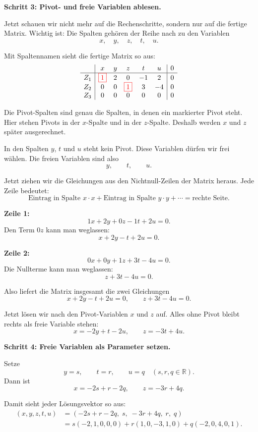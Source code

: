 \documentclass[a4paper,12pt]{article}
\newcommand{\piv}[1]{{\color{red}\boxed{#1}}}
\begin{document}
\textbf{Schritt 3: Pivot- und freie Variablen ablesen.}

Jetzt schauen wir nicht mehr auf die Rechenschritte, sondern nur auf die fertige Matrix.
Wichtig ist: Die Spalten geh\"oren der Reihe nach zu den Variablen
\[
x,\quad y,\quad z,\quad t,\quad u.
\]

Mit Spaltennamen sieht die fertige Matrix so aus:
\[
\begin{array}{c|ccccc|c}
 & x & y & z & t & u & 0 \\ \hline
Z_1 & \piv{1} & 2 & 0 & -1 & 2 & 0 \\
Z_2 & 0 & 0 & \piv{1} & 3 & -4 & 0 \\
Z_3 & 0 & 0 & 0 & 0 & 0 & 0
\end{array}
\]

Die Pivot-Spalten sind genau die Spalten, in denen ein markierter Pivot steht.
Hier stehen Pivots in der $x$-Spalte und in der $z$-Spalte.
Deshalb werden $x$ und $z$ sp\"ater ausgerechnet.

In den Spalten $y$, $t$ und $u$ steht kein Pivot.
Diese Variablen d\"urfen wir frei w\"ahlen.
Die freien Variablen sind also
\[
y,\qquad t,\qquad u.
\]

Jetzt ziehen wir die Gleichungen aus den Nichtnull-Zeilen der Matrix heraus.
Jede Zeile bedeutet:
\[
\text{Eintrag in Spalte }x\cdot x
+\text{Eintrag in Spalte }y\cdot y
+\cdots
=\text{rechte Seite}.
\]

\textbf{Zeile 1:}
\[
1x+2y+0z-1t+2u=0.
\]
Den Term $0z$ kann man weglassen:
\[
x+2y-t+2u=0.
\]

\textbf{Zeile 2:}
\[
0x+0y+1z+3t-4u=0.
\]
Die Nullterme kann man weglassen:
\[
z+3t-4u=0.
\]

Also liefert die Matrix insgesamt die zwei Gleichungen
\[
x+2y-t+2u=0,
\qquad
z+3t-4u=0.
\]

Jetzt l\"osen wir nach den Pivot-Variablen $x$ und $z$ auf.
Alles ohne Pivot bleibt rechts als freie Variable stehen:
\[
x=-2y+t-2u,
\qquad
z=-3t+4u.
\]

\textbf{Schritt 4: Freie Variablen als Parameter setzen.}

Setze
\[
y=s,\qquad t=r,\qquad u=q
\quad (s,r,q\in\mathbb{R}).
\]
Dann ist
\[
x=-2s+r-2q,
\qquad
z=-3r+4q.
\]

Damit sieht jeder L\"osungsvektor so aus:
\begin{align*}
(x,y,z,t,u)
&=(-2s+r-2q,\; s,\; -3r+4q,\; r,\; q) \\
&= s(-2,1,0,0,0)
 + r(1,0,-3,1,0)
 + q(-2,0,4,0,1).
\end{align*}
\end{document}
